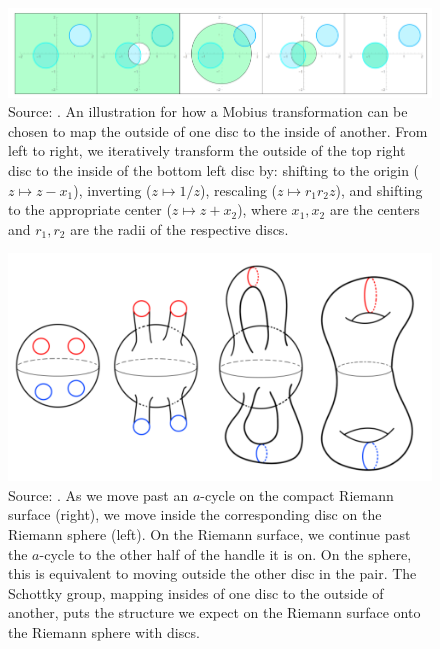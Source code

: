 \begin{figure}
    \center
    \includegraphics[width=\textwidth]{assetsB12/ChanSchottkyGroup.png}
    \caption{
        Source: \cite{Cha22}.
        An illustration for how a Mobius transformation can be chosen to map the outside of one disc to the inside of another.
        From left to right, we iteratively transform the outside of the top right disc to the inside of the bottom left disc by:
        shifting to the origin ($z \mapsto z-x_1$), inverting ($z \mapsto 1/z$), rescaling ($z \mapsto r_1r_2 z$), and shifting to the appropriate center ($z \mapsto z+x_2$), 
        where $x_1,x_2$ are the centers and $r_1,r_2$ are the radii of the respective discs.
    }
    \label{figB12:MobiusIllustration}
\end{figure}

\begin{figure}
    \center
    \includegraphics{assetsB12/ChanSchottkyCover.png}
    \caption{
        Source: \cite{Cha22}.
        As we move past an $a$-cycle on the compact Riemann surface (right), we move inside the corresponding disc on the Riemann sphere (left).
        On the Riemann surface, we continue past the $a$-cycle to the other half of the handle it is on.
        On the sphere, this is equivalent to moving outside the other disc in the pair.
        The Schottky group, mapping insides of one disc to the outside of another, puts the structure we expect on the Riemann surface onto the Riemann sphere with discs.
    }
    \label{figB12:SchottkyIntuition}
\end{figure}

